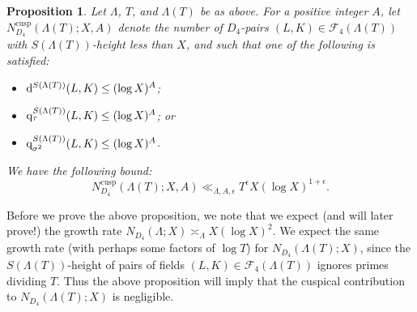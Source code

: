 \documentclass[10pt]{article}
\theoremstyle{plain}
\newtheorem{prop}[thm]{Proposition}
\theoremstyle{definition}
\theoremstyle{remark}
\DeclareMathOperator{\cusp}{cusp}
\def\FF{{\mathcal F}}
\newcommand{\D}{{\rm d}}
\newcommand{\q}{{\rm q}}
\begin{document}
\begin{prop}\label{propcusp}
Let $\Lambda$, $T$, and $\Lambda(T)$ be as above. For a positive integer $A$, let $N_{D_4}^{\cusp}(\Lambda(T);X,A)$
denote the number of $D_4$-pairs $(L,K)\in\FF_4(\Lambda(T))$ with
$S(\Lambda(T))$-height less than $X$, and such that one of the following
is satisfied:
\begin{itemize}
\item $\D^{S(\Lambda(T))}(L,K)\leq (\log X)^A$;
\item $\q_\tau^{S(\Lambda(T))}(L,K)\leq (\log X)^A$; or
\item $\q_{\sigma^2}^{S(\Lambda(T))}(L,K)\leq (\log X)^A$.
\end{itemize}
We have the following bound:
\begin{equation*}
N_{D_4}^{\cusp}(\Lambda(T);X,A)\ll_{\Lambda,A,\epsilon}
T^\epsilon X(\log X)^{1+\epsilon}.
\end{equation*}
\end{prop}
\noindent Before we prove the above proposition, we note that we expect (and will later prove!) the growth rate $N_{D_4}(\Lambda;X)\asymp_\Lambda X(\log X)^2$. We expect the same growth rate (with perhaps some factors of $\log T$) for $N_{D_4}(\Lambda(T);X)$, since the $S(\Lambda(T))$-height of pairs of fields $(L,K) \in \FF_4(\Lambda(T))$ ignores primes dividing $T$. Thus the above proposition will imply that the cuspical contribution to $N_{D_4}(\Lambda(T);X)$ is negligible.
\end{document}
